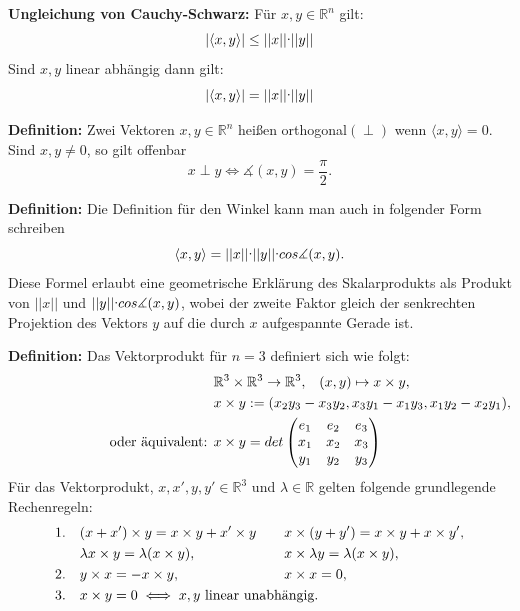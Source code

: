 \documentclass{article}
\let\oldcdot\cdot
\renewcommand{\cdot}{\raisebox{0.1ex}{$\oldcdot$}}
\begin{document}
\textbf{Ungleichung von Cauchy-Schwarz:} Für $x,y\in\mathbb{R}^n$ gilt:
\begin{equation*}
	|\langle x,y\rangle|\leq ||x||\cdot ||y||
\end{equation*}
Sind $x,y$ linear abhängig dann gilt:
\begin{equation*}
	|\langle x,y\rangle|=||x||\cdot ||y||
\end{equation*}

\textbf{Definition:} Zwei Vektoren $x,y\in\mathbb{R}^n$ heißen
orthogonal$(\perp)$ wenn $\langle x,y\rangle=0$. Sind $x,y\neq 0$, so gilt
offenbar 
\begin{equation*}
x\perp y\iff\measuredangle(x,y)=\frac{\pi}{2}.
\end{equation*}

\textbf{Definition:} Die Definition für den Winkel kann man auch in folgender
Form schreiben 
\begin{equation*}
\langle x,y\rangle=||x||\cdot||y||\cdot
cos\measuredangle(x,y).
\end{equation*}
Diese Formel erlaubt eine geometrische Erklärung des Skalarprodukts als Produkt
von $||x||$ und $||y||\cdot cos\measuredangle(x,y)$, wobei der zweite Faktor
gleich der senkrechten Projektion des Vektors $y$ auf die durch $x$
aufgespannte Gerade ist.

\textbf{Definition:} Das Vektorprodukt für $n=3$ definiert sich wie folgt:
\begin{alignat*}{2}
	&\mathbb{R}^3\times\mathbb{R}^3\to\mathbb{R}^3,&&(x,y)\mapsto x\times
	y,\\
	&\mathrlap{x\times y:=(x_2y_3-x_3y_2,x_3y_1-x_1y_3,x_1y_2-x_2y_1),}\\
	\text{oder äquivalent: } & \mathrlap{x\times y = det
	\begin{pmatrix}
		e_1 & e_2 & e_3\\
		x_1 & x_2 & x_3\\
		y_1 & y_2 & y_3
	\end{pmatrix}}
\end{alignat*}
Für das Vektorprodukt, $x,x',y,y'\in\mathbb{R}^3$ und $\lambda\in\mathbb{R}$
gelten folgende grundlegende Rechenregeln:
\begin{alignat*}{2}
	1.\quad&(x+x')\times y=x\times y+x'\times y \quad&& x\times(y+y')=x\times
	y+x\times y',\\
	& \lambda x\times y=\lambda(x\times y), && x\times \lambda
	y=\lambda(x\times y),\\
	2.\quad&y\times x=-x\times y,  && x\times x=0,\\
	3.\quad&\mathrlap{x\times y= 0\iff x,y\text{ linear unabhängig.}}
\end{alignat*}
\end{document}
